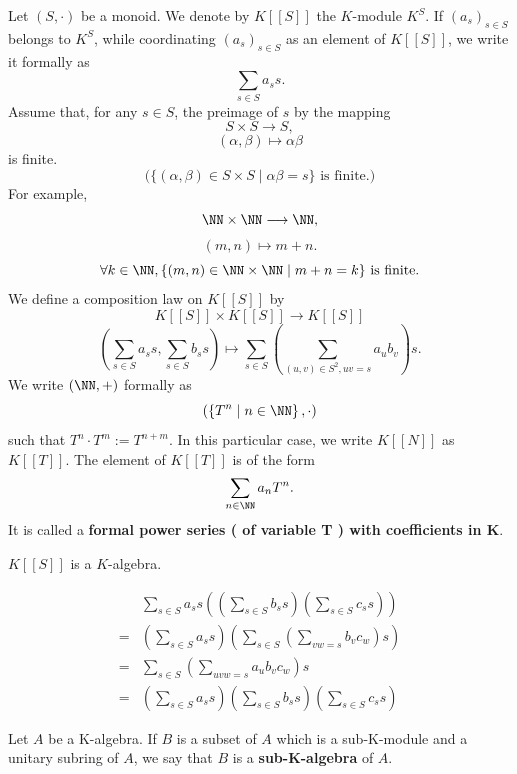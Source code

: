 \begin{exampleenv}
    Let $(S,\cdot)$ be a monoid. We denote by $K [\![S]\!]$ the $K$-module $K^S$. If $\left(a_s\right)_{s\in S}$ belongs to $K^S$, while coordinating $(a_s)_{s\in S}$ as an element of $K[\![S]\!]$, we write it formally as 
    $$\sum_{s\in S}a_s s.$$
    Assume that, for any $s\in S$, the preimage of $s$ by the mapping
    $$S\times S\longrightarrow S,$$
    $$(\alpha, \beta)\longmapsto \alpha\beta$$
    is finite.
    $$\text{(}\{\left(\alpha,\beta\right)\in S\times S\mid \alpha\beta=s\} \text{ is finite.}\text{)}$$
    For example, 
    $$\NN\times \NN\longrightarrow \NN,$$
    $$\left(m,n\right)\longmapsto m+n.$$
    $$\forall k\in \NN,\{(m,n)\in \NN\times \NN\mid m+n=k \} \text{ is finite.}$$
    We define a composition law on $K[\![S]\!]$ by
    $$K[\![S]\!]\times K[\![S]\!]\longrightarrow K[\![S]\!]$$
    $$\left(\sum_{s\in S}a_ss,\sum_{s\in S}b_ss\right)\longmapsto \sum_{s\in S}\left(\sum_{(u,v)\in S^2,uv=s}a_ub_v\right)s.$$
    We write $(\NN,+)$ formally as 
    $$\left(\left\{T^n\mid n\in \NN\right\},\cdot\right)$$
    such that  $T^n\cdot T^m:=T^{n+m}$. In this particular case, we write $K [\![N]\!]$ as $K[\![T]\!]$. The element of $K[\![T]\!]$ is of the form
    $$\sum_{n\in \NN}a_nT^n.$$
    It is called a \textbf{formal power series ( of variable T ) with coefficients in K}.

\end{exampleenv}
\begin{propositionenv}
    $K[\![S]\!]$ is a $K$-algebra.
\end{propositionenv}
\begin{proofenv}
    \begin{align*}
       & \sum_{s\in S} a_s s \left( \left( \sum_{s\in S} b_s s \right) \left( \sum_{s\in S} c_s s \right) \right)\\
        =&\left(\sum_{s\in S} a_s s \right)\left( \sum_{s\in S} \left(\sum_{vw=s}b_vc_w\right) s \right)\\
        = &\sum_{s\in S} \left( \sum_{uvw=s} a_u b_v c_w \right)s\\
        =& \left( \sum_{s\in S} a_s s \right)\left( \sum_{s\in S} b_s s \right) \left( \sum_{s\in S} c_s s \right) 
    \end{align*}


\end{proofenv}
\begin{definitionenv}
    Let $A$ be a K-algebra. If $B$ is a subset of $A$ which is a sub-K-module and a unitary subring of $A$, we say that $B$ is a \textbf{sub-K-algebra} of $A$.
\end{definitionenv}
